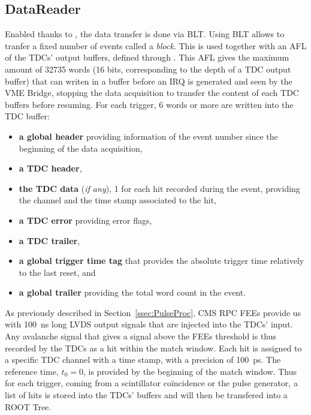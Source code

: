 	\subsection{DataReader}
	\label{app1:ssec:DataReader}
	
	Enabled thanks to , the data transfer is done via \acf{BLT}. Using BLT allows to tranfer a fixed number of events called a \textit{block}. This is used together with an \acf{AFL} of the TDCs' output buffers, defined through . This AFL gives the maximum amount of 32735 words (16 bits, corresponding to the depth of a TDC output buffer) that can writen in a buffer before an \acf{IRQ} is generated and seen by the VME Bridge, stopping the data acquisition to transfer the content of each TDC buffers before resuming. For each trigger, 6 words or more are written into the TDC buffer:
	
	\begin{itemize}
		\item \textbf{a global header} providing information of the event number since the beginning of the data acquisition,
		\item \textbf{a TDC header},
		\item \textbf{the TDC data} (\textit{if any}), 1 for each hit recorded during the event, providing the channel and the time stamp associated to the hit,
		\item \textbf{a TDC error} providing error flags,
		\item \textbf{a TDC trailer},
		\item \textbf{a global trigger time tag} that provides the absolute trigger time relatively to the last reset, and
		\item \textbf{a global trailer} providing the total word count in the event.
	\end{itemize}
	
	As previously described in Section~\ref{ssec:PulseProc}, CMS RPC FEEs provide us with \SI{100}{ns} long LVDS output signals that are injected into the TDCs' input. Any avalanche signal that gives a signal above the FEEs threshold is thus recorded by the TDCs as a hit within the match window. Each hit is assigned to a specific TDC channel with a time stamp, with a precision of \SI{100}{ps}. The reference time, $t_0=0$, is provided by the beginning of the match window. Thus for each trigger, coming from a scintillator coïncidence or the pulse generator, a list of hits is stored into the TDCs' buffers and will then be transfered into a ROOT Tree.\\
	
